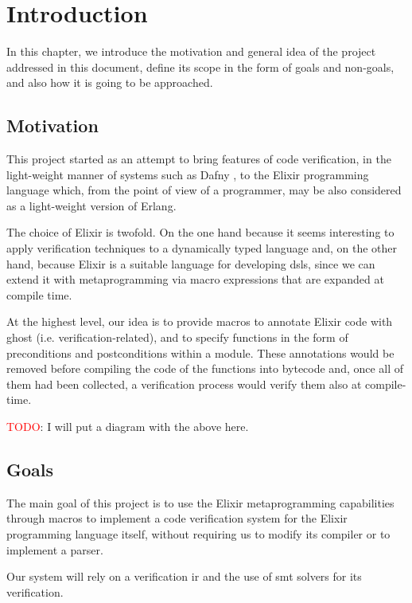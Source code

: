 \chapter{Introduction}
\label{cap:introduction}

In this chapter, we introduce the motivation and general idea of the project
addressed in this document, define its scope in the form of goals and non-goals,
and also how it is going to be approached.

\section{Motivation}

This project started as an attempt to bring features of code verification, in
the light-weight manner of systems such as Dafny \citep{DafnyManual}, to the
Elixir programming language which, from the point of view of a programmer, may
be also considered as a light-weight version of Erlang.

The choice of Elixir is twofold. On the one hand because it seems interesting to
apply verification techniques to a dynamically typed language and, on the other
hand, because Elixir is a suitable language for developing \gls{dsl}s, since we
can extend it with metaprogramming via macro expressions that are expanded at
compile time.

At the highest level, our idea is to provide macros to annotate Elixir code with
ghost (i.e. verification-related), and to specify functions in the form of
preconditions and postconditions within a module. These annotations would be
removed before compiling the code of the functions into bytecode and, once all
of them had been collected, a verification process would verify them also at
compile-time.

\textcolor{red}{TODO}: I will put a diagram with the above here.

\section{Goals}

The main goal of this project is to use the Elixir metaprogramming capabilities
through macros to implement a code verification system for the Elixir
programming language itself, without requiring us to modify its compiler or to
implement a parser.

Our system will rely on a verification \gls{ir} and the use of \acrshort{smt}
solvers for its verification.

